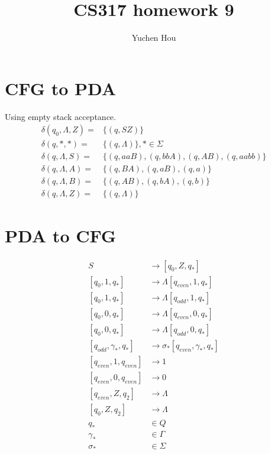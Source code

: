 \documentclass{article}
\begin{document}
\lstset{language=Java}
\title{CS317 homework 9}
\author{Yuchen Hou}
\maketitle
\section{CFG to PDA}
Using empty stack acceptance.
\begin{align*}
\delta(q_0, \Lambda, Z) =& \{(q, SZ)\}\\
\delta(q, *, *) =& \{(q, \Lambda)\}, * \in \Sigma\\
\delta(q, \Lambda, S) =& \{(q, aaB), (q, bbA), (q, AB), (q, aabb) \}\\
\delta(q, \Lambda, A) =& \{(q, BA), (q, aB), (q, a) \}\\
\delta(q, \Lambda, B) =& \{(q, AB), (q, bA), (q, b) \}\\
\delta(q, \Lambda, Z) =& \{(q, \Lambda)\}
\end{align*}
\section{PDA to CFG}
\begin{align*}
S &\to [q_0, Z, q_*]\\
[q_0, 1, q_*] &\to \Lambda [q_{even}, 1, q_*] \\
[q_0, 1, q_*] &\to \Lambda [q_{odd}, 1, q_*] \\
[q_0, 0, q_*] &\to \Lambda [q_{even}, 0, q_*] \\
[q_0, 0, q_*] &\to \Lambda [q_{odd}, 0, q_*] \\
[q_{odd}, \gamma_*, q_*] &\to \sigma_* [q_{even}, \gamma_*, q_*]\\
[q_{even}, 1, q_{even}] &\to 1\\
[q_{even}, 0, q_{even}] &\to 0\\
[q_{even}, Z, q_{2}] &\to \Lambda\\
[q_{0}, Z, q_{2}] &\to \Lambda\\
q_* &\in Q\\
\gamma_* &\in \Gamma\\
\sigma_* &\in \Sigma
\end{align*}
\end{document}
